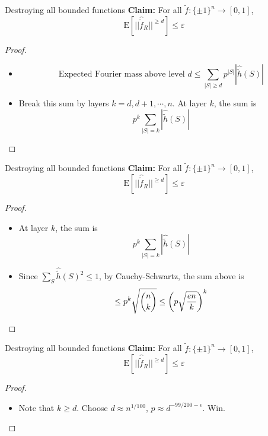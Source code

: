 \begin{frame}{Destroying all bounded functions}
	\textbf{Claim: }For all $\tilde{f}: \{ \pm 1\}^n \rightarrow [0,1]$,
	$$ \text{E} [|| \hat{\tilde{f}}_R ||^{\geq d}] \leq \varepsilon$$
	\begin{proof}
		\begin{itemize}
			\item<1-> 
			$$ \text{Expected Fourier mass above level }d \leq \displaystyle \sum_{|S| \geq d} p^{|S|} |\hat{\tilde{h}}(S)|$$
			\item<2-> Break this sum by layers $k= d, d+1, \cdots , n$.  At layer $k$, the sum is
			$$ p^{k} \displaystyle \sum_{|S|=k} |\hat{\tilde{h}}(S)|$$			
		\end{itemize}
	\end{proof}
	
\end{frame}


\begin{frame}{Destroying all bounded functions}
	\textbf{Claim: }For all $\tilde{f}: \{ \pm 1\}^n \rightarrow [0,1]$,
	$$ \text{E} [|| \hat{\tilde{f}}_R ||^{\geq d}] \leq \varepsilon$$
	\begin{proof}
		\begin{itemize}
			\item<1-> 
			 At layer $k$, the sum is
			$$ p^{k} \displaystyle \sum_{|S|=k} |\hat{\tilde{h}}(S)|$$		
			\item<2-> Since $\sum_S \hat{\tilde{h}}(S)^2 \leq 1$, by Cauchy-Schwartz, the sum above is 
			$$ \leq p^{k} \sqrt{\dbinom{n}{k}} \leq \left(p \sqrt{\dfrac{en}{k}}  \right)^k$$	
		\end{itemize}
	\end{proof}
	
\end{frame}

\begin{frame}{Destroying all bounded functions}
	\textbf{Claim: }For all $\tilde{f}: \{ \pm 1\}^n \rightarrow [0,1]$,
	$$ \text{E} [|| \hat{\tilde{f}}_R ||^{\geq d}] \leq \varepsilon$$
	\begin{proof}
		\begin{itemize}
			\item<1-> 
			Note that $k \geq d$. Choose $d \approx n^{1/100}$, $p \approx d^{-99/200 - \epsilon}$. Win.
		\end{itemize}
	\end{proof}
	
\end{frame}


